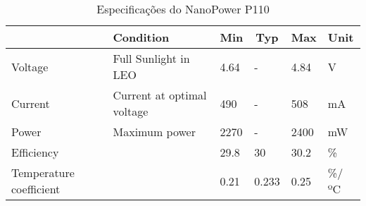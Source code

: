 \begin{table}[H]
\centering
\caption{Especificações do NanoPower P110}
\label{pv_specs_table}
\begin{tabular}{|l|l|l|l|l|l|} 
\cline{2-6}
\multicolumn{1}{c|}{} & Condition                  & \multicolumn{1}{c|}{Min} & \multicolumn{1}{c|}{Typ} & \multicolumn{1}{c|}{Max} & Unit  \\ 
\hline
Voltage               & Full Sunlight in LEO       & 4.64                     & -                        & 4.84                     & V     \\ 
\hline
Current               & Current at optimal voltage & 490                      & -                        & 508                      & mA    \\ 
\hline
Power                 & Maximum power              & 2270                     & -                        & 2400                     & mW    \\ 
\hline
Efficiency            &                            & 29.8                     & 30                       & 30.2                     & \%    \\
\hline
Temperature coefficient &                            & 0.21                     & 0.233                       & 0.25                     & \%/ºC    \\
\hline
\end{tabular}
\end{table}